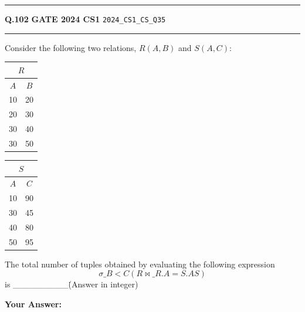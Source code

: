 \documentclass[a4paper,10pt]{article}
\begin{document}
\vspace{6pt}\hrule height 0.35pt\vspace{6pt}
\noindent
\begin{tcolorbox}[
    blanker,
    sidebyside,
    sidebyside align=top,
    lefthand width=0.55\textwidth,
    top=4pt, bottom=4pt, left=0pt, right=0pt,
    middle=16pt,
    underlay={
        \draw[dashed, black!80, line width=0.8pt, dash pattern=on 4pt off 3pt]
            ([xshift=0.55\textwidth+8pt]frame.north west) --
            ([xshift=0.55\textwidth+8pt]frame.south west);
    }
]
\textbf{Q.102}  \hfill {\footnotesize\textbf{GATE 2024 CS1} \quad \tiny\texttt{2024\_CS1\_CS\_Q35}}
\vspace{2pt}\hrule height 0.3pt\vspace{4pt}

Consider the following two relations, $R(A,B)$ and $S(A,C)$:
\begin{center}
\begin{tabular}{|c|c|}
\multicolumn{2}{c}{$R$} \\
\hline
$A$ & $B$ \\
\hline
10 & 20 \\
20 & 30 \\
30 & 40 \\
30 & 50 \\
\hline
\end{tabular}
\qquad
\begin{tabular}{|c|c|}
\multicolumn{2}{c}{$S$} \\
\hline
$A$ & $C$ \\
\hline
10 & 90 \\
30 & 45 \\
40 & 80 \\
50 & 95 \\
\hline
\end{tabular}
\end{center}
The total number of tuples obtained by evaluating the following expression
\[ \sigma\_{B < C}(R \bowtie\_{R.A = S.A} S) \]
is \_\_\_\_\_\_\_\_\_\. (Answer in integer)

\par\vspace{6pt}\noindent\textbf{Your Answer:} \fbox{\rule{0pt}{1.3ex}\hspace{3cm}}

\tcblower


\end{tcolorbox}
\end{document}

